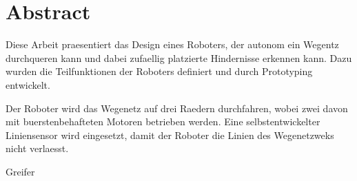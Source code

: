 \section*{Abstract}

Diese Arbeit praesentiert das Design eines Roboters, der autonom ein Wegentz durchqueren kann und dabei zufaellig platzierte Hindernisse erkennen kann. Dazu wurden die Teilfunktionen der Roboters definiert und durch Prototyping entwickelt.

Der Roboter wird das Wegenetz auf drei Raedern durchfahren, wobei zwei davon mit buerstenbehafteten Motoren betrieben werden. Eine selbstentwickelter Liniensensor wird eingesetzt, damit der Roboter die Linien des Wegenetzweks nicht verlaesst.

Greifer